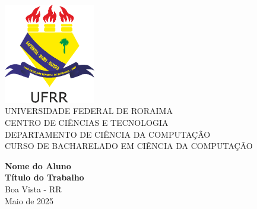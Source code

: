 \begin{titlepage}

    \begin{center}
        \includegraphics[width=0.3\textwidth]{estilo/ufrr-logo.png} \\[2cm]

        {\large
        UNIVERSIDADE FEDERAL DE RORAIMA\\
        CENTRO DE CIÊNCIAS E TECNOLOGIA\\
        DEPARTAMENTO DE CIÊNCIA DA COMPUTAÇÃO\\
        CURSO DE BACHARELADO EM CIÊNCIA DA COMPUTAÇÃO\\[3cm]
        }

        {\bfseries\Large Nome do Aluno}\\[1.5cm]

        {\bfseries\LARGE Título do Trabalho}\\[3.5cm]

        {\large Boa Vista - RR\\
        Maio de 2025}
    \end{center}
\end{titlepage}
